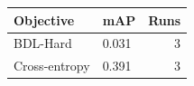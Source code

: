 \begin{tabular}{llr}
\toprule
Objective & mAP & Runs \\
\midrule
BDL-Hard & 0.031 & 3 \\
Cross-entropy & 0.391 & 3 \\
\bottomrule
\end{tabular}

